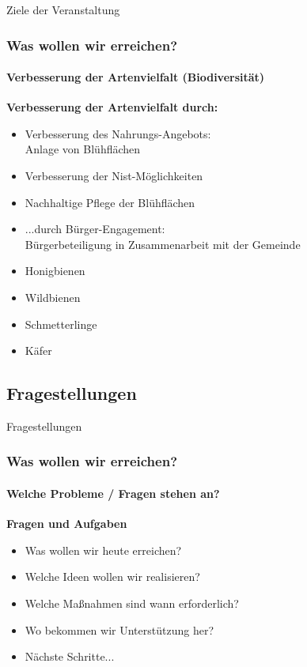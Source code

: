 \documentclass[aspectratio=43]{beamer}
\begin{document}
\begin{frame}{Ziele der Veranstaltung}
	\frametitle{Was wollen wir erreichen?} 
	\framesubtitle{Verbesserung der Artenvielfalt (Biodiversität)}

	\textbf{Verbesserung der Artenvielfalt durch:}
\begin{itemize} 
	\item 
		Verbesserung des Nahrungs-Angebots:	\\
		Anlage von Blühflächen \pause
	\item 
		Verbesserung der Nist-Möglichkeiten	 \pause
	\item 
		Nachhaltige Pflege der Blühflächen \pause
	\item 
		...durch Bürger-Engagement:\\
		Bürgerbeteiligung in Zusammenarbeit mit der Gemeinde%
        \item  Honigbienen
        \item  Wildbienen
        \item  Schmetterlinge
        \item  Käfer
\end{itemize}
\end{frame}

\subsection{Fragestellungen}

\begin{frame}{Fragestellungen}
\frametitle{Was wollen wir erreichen?} 
\framesubtitle{Welche Probleme / Fragen stehen an?}
\textbf{Fragen und Aufgaben}\\
\begin{itemize}
	\item 
		Was wollen wir heute erreichen? \pause 
	\item 
		Welche Ideen wollen wir realisieren? \pause
	\item 
		Welche Maßnahmen sind wann erforderlich? \pause
	\item 
		Wo bekommen wir Unterstützung her? \pause
	\item  
		Nächste Schritte...%
\end{itemize}
\end{frame}
\end{document}
